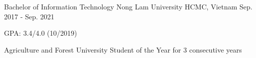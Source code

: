 

\begin{cventries}

  \cventry
    {Bachelor of Information Technology} %
    {Nong Lam University} %
    {HCMC, Vietnam} %
    {Sep. 2017 - Sep. 2021} %
    {
      \begin{cvitems} %
        \item {GPA: 3.4/4.0 (10/2019)}
        \item {Agriculture and Forest University Student of the Year for 3 consecutive years}
      \end{cvitems}
    }

\end{cventries}
